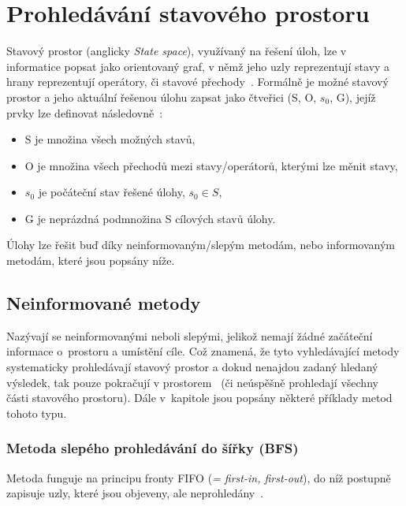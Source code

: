 \section{Prohledávání stavového prostoru}
Stavový prostor (anglicky \textit{State space}), využívaný na řešení úloh, lze v informatice popsat jako orientovaný graf, v němž jeho uzly reprezentují stavy a hrany reprezentují operátory, či stavové přechody~\cite{State-Space_Search}. Formálně je možné stavový prostor a jeho aktuální řešenou úlohu zapsat jako čtveřici (S, O, $s_0$, G), jejíž prvky lze definovat následovně~\cite{izu}:
\begin{itemize}
    \item S je množina všech možných stavů,
    \item O je množina všech přechodů mezi stavy/operátorů, kterými lze měnit stavy,
    \item $s_0$ je počáteční stav řešené úlohy, $s_0 \in S$,
    \item G je neprázdná podmnožina S cílových stavů úlohy.
\end{itemize}
Úlohy lze řešit buď díky neinformovaným/slepým metodám, nebo informovaným metodám, které jsou popsány níže. 

\subsection*{Neinformované metody}
Nazývají se neinformovanými neboli slepými, jelikož nemají žádné začáteční informace o~prostoru a umístění cíle. Což znamená, že tyto vyhledávající metody systematicky prohledávají stavový prostor a dokud nenajdou zadaný hledaný výsledek, tak pouze pokračují v  prostorem~\cite{poole2023artificial} (či neúspěšně prohledají všechny části stavového prostoru). Dále v~kapitole jsou popsány některé příklady metod tohoto typu.

\subsubsection*{\textbullet Metoda slepého prohledávání do šířky (BFS)}
Metoda funguje na principu fronty FIFO (\textit{= first-in, first-out}), do níž postupně zapisuje uzly, které jsou objeveny, ale neprohledány~\cite{poole2023artificial}. 

